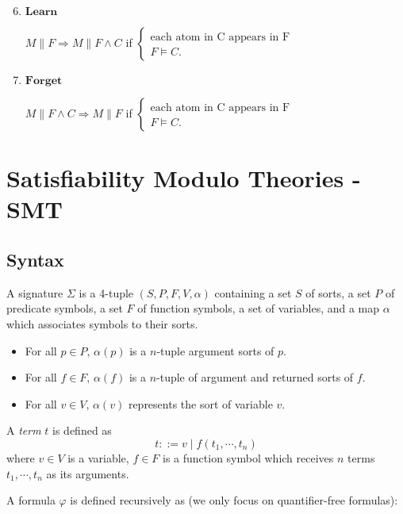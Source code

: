 \begin{enumerate}
\setcounter{enumi}{5}
\item $\mathbf{Learn}$

$M \parallel F \Longrightarrow M \parallel F \wedge C$ if $\left\{ 
  \begin{array}{l}
    \text{each atom in C appears in F} \\
    F \models C.
  \end{array} \right.$ 
  
\item $\mathbf{Forget}$

$M \parallel F \wedge C \Longrightarrow M \parallel F$ if $\left\{ 
  \begin{array}{l}
    \text{each atom in C appears in F} \\
    F \models C.
  \end{array} \right.$   
\end{enumerate}

\section{Satisfiability Modulo Theories - SMT}
\subsection{Syntax} \label{subsection:smt-syntax}
\begin{definition}
A signature $\Sigma$ is a 4-tuple $(S, P, F, V, \alpha)$ containing a set $S$ of sorts, a set $P$ of predicate symbols, a set $F$ of function symbols, a set of variables, and a map $\alpha$ which associates symbols to their sorts.
\begin{itemize}
\item For all $p \in P, \, \alpha(p)$ is a $n$-tuple argument sorts of $p$.
\item For all $f \in F, \, \alpha(f)$ is a $n$-tuple of argument and returned sorts of $f$.
\item For all $v \in V, \, \alpha(v)$ represents the sort of variable $v$.
\end{itemize}
\end{definition}
A \emph{term} $t$ is defined as
\[t ::= v \mid f(t_1, \cdots, t_n)\]
where $v \in V$ is a variable, $f \in F$ is a function symbol which receives $n$ terms $t_1, \cdots, t_n$ as its arguments.

A formula $\varphi$ is defined recursively as (we only focus on quantifier-free formulas):


